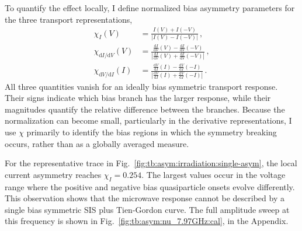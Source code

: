         To quantify the effect locally, I define normalized bias asymmetry parameters for the three transport representations,
        \begin{align}
            \chi_I(V) &= \frac{I(V)+I(-V)}{\left|I(V)-I(-V)\right|}\,,\\
            \chi_{\mathrm{d}I/\mathrm{d}V}(V) &= \frac{\tfrac{\mathrm{d}I}{\mathrm{d}V}(V) - \tfrac{\mathrm{d}I}{\mathrm{d}V}(-V)}{\left|\tfrac{\mathrm{d}I}{\mathrm{d}V}(V) + \tfrac{\mathrm{d}I}{\mathrm{d}V}(-V) \right|}\,,\\
            \chi_{\mathrm{d}V/\mathrm{d}I}(I) &= \frac{\tfrac{\mathrm{d}V}{\mathrm{d}I}(I) - \tfrac{\mathrm{d}V}{\mathrm{d}I}(-I)}{\left|\tfrac{\mathrm{d}V}{\mathrm{d}I}(I) + \tfrac{\mathrm{d}V}{\mathrm{d}I}(-I) \right|}\,.
            \label{eq:tb:asym:rect-chi}
        \end{align}
        All three quantities vanish for an ideally bias symmetric transport response. Their signs indicate which bias branch has the larger response, while their magnitudes quantify the relative difference between the branches. Because the normalization can become small, particularly in the derivative representations, I use $\chi$ primarily to identify the bias regions in which the symmetry breaking occurs, rather than as a globally averaged measure.

        For the representative trace in Fig.~\ref{fig:tb:asym:irradiation:single-asym}, the local current asymmetry reaches $\chi_I=0.254$. The largest values occur in the voltage range where the positive and negative bias quasiparticle onsets evolve differently. This observation shows that the microwave response cannot be described by a single bias symmetric SIS plus Tien-Gordon curve. The full amplitude sweep at this frequency is shown in Fig.~\ref{fig:tb:asym:nu_7.97GHz:cal}, in the Appendix.

